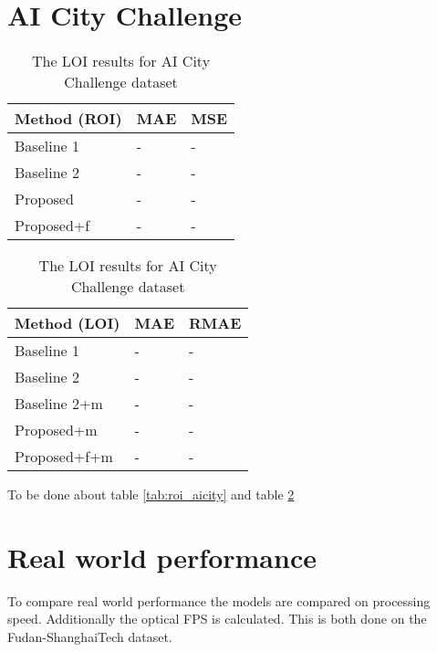 \section{AI City Challenge}

\begin{table}[!htb]
    \begin{minipage}{.5\linewidth}
      \centering
		\begin{tabular}{lll}
		\hline
		Method (ROI)                               & MAE & MSE \\ \hline
		\multicolumn{1}{l|}{Baseline 1}          & - & - \\
		\multicolumn{1}{l|}{Baseline 2}          & - & - \\
		\multicolumn{1}{l|}{Proposed}        	 & - & - \\
		\multicolumn{1}{l|}{Proposed+f} & - & - \\ \hline
		\end{tabular}
		\caption{\label{tab:roi_aicity}The ROI results for AI City Challenge dataset}
	\end{minipage}
	\begin{minipage}{.5\linewidth}
      \centering
		\begin{tabular}{lll}
		\hline
		Method (LOI)                               & MAE & RMAE \\ \hline
		\multicolumn{1}{l|}{Baseline 1}          & - & - \\
		\multicolumn{1}{l|}{Baseline 2}          & - & - \\
		\multicolumn{1}{l|}{Baseline 2+m}      & - & - \\
		\multicolumn{1}{l|}{Proposed+m}        	 & - & - \\
		\multicolumn{1}{l|}{Proposed+f+m} & - & - \\ \hline
		\end{tabular}
		\caption{\label{tab:loi_aicity}The LOI results for AI City Challenge dataset}
	\end{minipage}
\end{table}

To be done about table \ref{tab:roi_aicity} and table \ref{tab:loi_aicity}


\section{Real world performance}
To compare real world performance the models are compared on processing speed. Additionally the optical FPS is calculated. This is both done on the Fudan-ShanghaiTech dataset.

